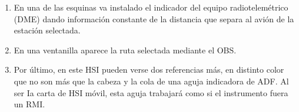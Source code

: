 \begin{enumerate}

\item En una de las esquinas va instalado el indicador del equipo radiotelemétrico (DME) dando información constante de la distancia que separa al avión de la estación selectada.


\item En una ventanilla aparece la ruta selectada mediante el OBS. 


\item Por último, en este HSI pueden verse dos referencias más, en distinto color que no son más que la cabeza y la cola de una aguja indicadora de ADF. Al ser Ia carta de HSI móvil, esta aguja trabajará como si el instrumento fuera un RMI.

\end{enumerate}



